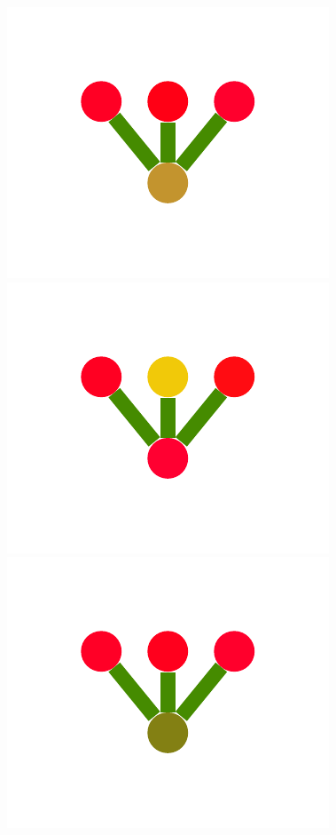 \documentclass[a4paper,10pt]{article}
\begin{document}
\begin{figure}
{    \includegraphics[scale=.26]{../figures/vector/4-2-1-noisyprog-postB-0.pdf}
    \includegraphics[scale=.26]{../figures/vector/4-2-1-noisyprog-postB-1.pdf}
    \includegraphics[scale=.26]{../figures/vector/4-2-1-noisyprog-postB-2.pdf}
}
\end{figure}
\end{document}
